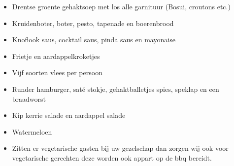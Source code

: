 \begin{itemize}
\item	Drentse groente gehaktsoep  met los alle garnituur (Bosui, croutons etc.)
\item	Kruidenboter, boter, pesto, tapenade en boerenbrood
\item	Knoflook saus, cocktail saus, pinda saus en mayonaise
\item	Frietje en aardappelkroketjes
\item	Vijf soorten vlees per persoon
\item	Runder hamburger, saté stokje, gehaktballetjes spies, speklap en een braadworst
\item	Kip kerrie salade en aardappel salade
\item	Watermeloen
\item	Zitten er vegetarische gasten bij uw gezelschap dan zorgen wij ook voor vegetarische gerechten deze worden ook appart op de bbq bereidt.
\end{itemize}
